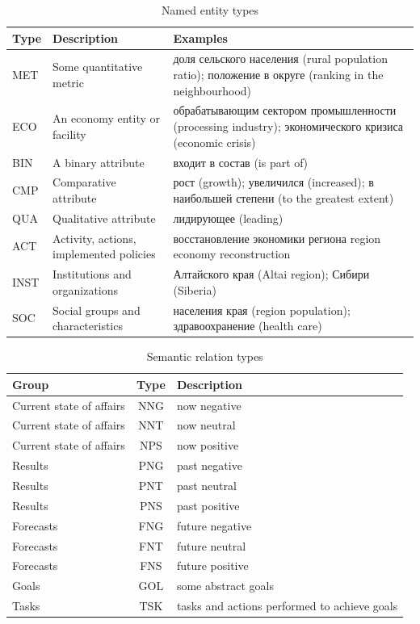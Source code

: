 \documentclass{dialogue}
\begin{document}
	\begin{table}[bth]
		\centering
		\small
		\begin{tabular}{p{0.7cm}|p{4cm}|p{10cm}}
			\hline
			Type & Description & Examples\\ \hline
			MET & Some quantitative metric & доля сельского населения (rural population ratio); положение в округе (ranking in the neighbourhood)\\ \hline
			ECO & An economy entity or facility & обрабатывающим сектором промышленности (processing industry); экономического кризиса (economic crisis) \\ \hline
			BIN & A binary attribute & входит в состав (is part of)\\ \hline
			CMP & Comparative attribute & рост (growth); увеличился (increased); в наибольшей степени (to the greatest extent)\\ \hline
			QUA & Qualitative attribute & лидирующее (leading)\\ \hline
			ACT & Activity, actions, implemented policies & восстановление экономики региона {region economy reconstruction}\\ \hline
			INST & Institutions and organizations & Алтайского края (Altai region); Сибири (Siberia)\\ \hline
			SOC & Social groups and characteristics & населения края (region population); здравоохранение (health care) \\ \hline
		\end{tabular}
		\caption{Named entity types}
		\label{tab:ner}
	\end{table}
	\begin{table}[bth]
		\centering
		\small
		\begin{tabular}{p{3.7cm}|c|p{3.8cm}}
			\hline
			Group & Type & Description\\ \hline\hline
			Current state of affairs & NNG & now negative \\ \hline
			Current state of affairs & NNT & now neutral \\ \hline
			Current state of affairs & NPS & now positive \\ \hline\hline
			
			Results & PNG & past negative\\ \hline
			Results & PNT & past neutral\\ \hline
			Results & PNS & past positive\\ \hline\hline
			
			Forecasts & FNG & future negative\\ \hline
			Forecasts & FNT & future neutral\\ \hline
			Forecasts & FNS & future positive\\ \hline\hline
			
			Goals & GOL & some abstract goals\\ \hline
			Tasks & TSK & tasks and actions performed to achieve goals\\ \hline
			
		\end{tabular}
		\caption{Semantic relation types}
		\label{tab:rel}
	\end{table}
	
\end{document}
